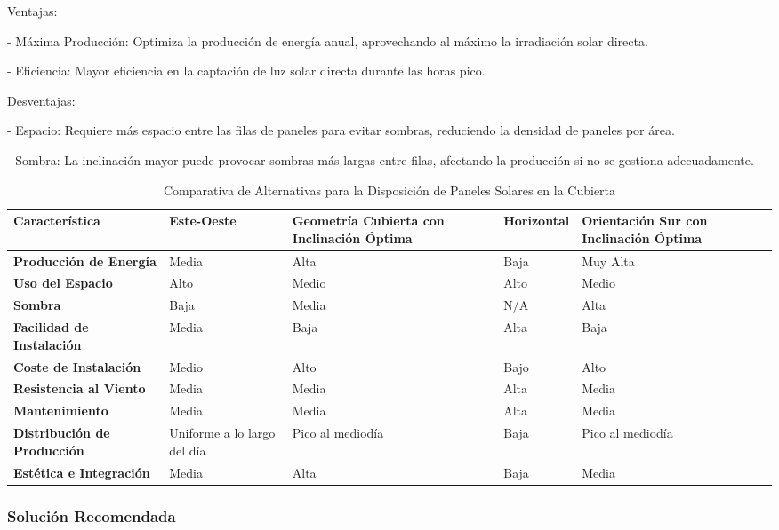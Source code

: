\documentclass{article}
\begin{document}
Ventajas:

- Máxima Producción: Optimiza la producción de energía anual, aprovechando al máximo la irradiación solar directa.

- Eficiencia: Mayor eficiencia en la captación de luz solar directa durante las horas pico.

Desventajas:

- Espacio: Requiere más espacio entre las filas de paneles para evitar sombras, reduciendo la densidad de paneles por área.

- Sombra: La inclinación mayor puede provocar sombras más largas entre filas, afectando la producción si no se gestiona adecuadamente.


\begin{table}[H]
    \centering
    \setlength{\tabcolsep}{4pt} %
    \renewcommand{\arraystretch}{1.2} %
    \begin{tabular}{p{5cm} p{2cm} p{2cm} p{2cm} p{2cm}}
    \toprule
    \textbf{Característica} & \textbf{Este-Oeste} & \textbf{Geometría Cubierta con Inclinación Óptima} & \textbf{Horizontal} & \textbf{Orientación Sur con Inclinación Óptima} \\
    \midrule
    \textbf{Producción de Energía} & Media & Alta & Baja & Muy Alta \\
    \textbf{Uso del Espacio} & Alto & Medio & Alto & Medio \\
    \textbf{Sombra} & Baja & Media & N/A & Alta \\
    \textbf{Facilidad de Instalación} & Media & Baja & Alta & Baja \\
    \textbf{Coste de Instalación} & Medio & Alto & Bajo & Alto \\
    \textbf{Resistencia al Viento} & Media & Media & Alta & Media \\
    \textbf{Mantenimiento} & Media & Media & Alta & Media \\
    \textbf{Distribución de Producción} & Uniforme a lo largo del día & Pico al mediodía & Baja & Pico al mediodía \\
    \textbf{Estética e Integración} & Media & Alta & Baja & Media \\
    \bottomrule
    \end{tabular}
    \caption{Comparativa de Alternativas para la Disposición de Paneles Solares en la Cubierta}
    \label{tab:comparativa}
    \end{table}
    
\subsubsection*{Solución Recomendada}
\end{document}
